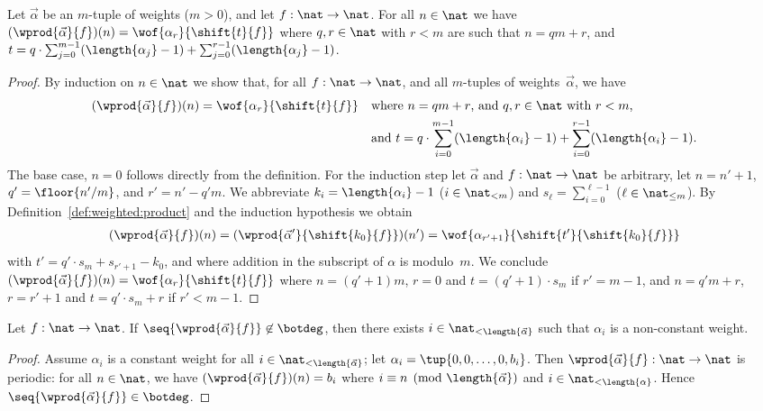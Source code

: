 \begin{lemma}\label{lem:wprod:nth}
  Let $\vec{\alpha}$ be an $m$-tuple of weights ($m > 0$), and let $f : \nat \to \nat$.
  For all $n \in \nat$ we have 
  $(\wprod{\vec{\alpha}}{f})(n) = \wof{\alpha_r}{\shift{t}{f} }$
  where $q,r \in \nat$ with $r < m$ are such that $n = qm + r$,
  and $t = q \cdot \sum_{j = 0}^{m-1}(\length{\alpha_j} - 1) + \sum_{j = 0}^{r-1}(\length{\alpha_j} - 1)$.
\end{lemma}
\begin{proof}
  By induction on $n \in \nat$ we show that, 
  for all $f : \nat \to \nat$, and all $m$-tuples of weights~$\vec{\alpha}$, 
  we have
  \begin{align*}
    (\wprod{\vec{\alpha}}{f})(n) = \wof{\alpha_r}{\shift{t}{f}}
    &&&\text{where $n = qm + r$, and $q,r \in \nat$ with $r < m$,}\\
    &&&\text{and $t = q \cdot \sum_{i = 0}^{m-1}(\length{\alpha_i} - 1) + \sum_{i = 0}^{r-1}(\length{\alpha_i} - 1)$.}
  \end{align*}
  The base case, $n = 0$ follows directly from the definition.
  For the induction step let $\vec{\alpha}$ and $f : \nat \to \nat$ be arbitrary,
  let $n = n' + 1$, $q' = \floor{n'/m}$, and $r' = n' - q'm$.
  We abbreviate $k_i = \length{\alpha_i} - 1$ ($i \in \nat_{<m}$) 
  and $s_\ell = \sum_{i=0}^{\ell-1}$ ($\ell \in \nat_{\le m}$).
  By Definition~\ref{def:weighted:product} and the induction hypothesis we obtain
  \begin{align*}
    (\wprod{\vec{\alpha}}{f})(n) 
    = (\wprod{\vec{\alpha}'}{\shift{k_0}{f}})(n') 
    = \wof{\alpha_{r'+1}}{\shift{t'}{\shift{k_0}{f}}}
  \end{align*}
  with $t' = q' \cdot s_m + s_{r'+1} - k_0$, 
  and where addition in the subscript of $\alpha$ is modulo~$m$.
  We conclude $(\wprod{\vec{\alpha}}{f})(n) = \wof{\alpha_{r}}{\shift{t}{f}}$
  where $n = (q'+1)m$, $r = 0$ and $t = (q'+1) \cdot s_m$ if $r' = m - 1$,
  and $n = q'm + r$, $r = r' + 1$ and $t = q' \cdot s_m + r$ if $r' < m - 1$.
\end{proof}

\begin{lemma}\label{lem:wprod:not:botdeg}
  Let $f : \nat \to \nat$.
  If $\seq{\wprod{\vec{\alpha}}{f}} \not\in \botdeg$, 
  then there exists $i \in \nat_{<\length{\vec{\alpha}}}$ such that $\alpha_i$ is a non-constant weight.
\end{lemma}
\begin{proof}Assume $\alpha_i$ is a constant weight for all $i \in \nat_{<\length{\vec{\alpha}}}$; 
  let $\alpha_i = \tup{0,0,\ldots,0,b_i}$. Then $\wprod{\vec{\alpha}}{f} : \nat \to \nat$ is periodic: for all $n\in\nat$, 
  we have $(\wprod{\vec{\alpha}}{f})(n) = b_i$ where $i \equiv n \pmod{\length{\vec{\alpha}}}$
  and $i \in \nat_{<\length{\alpha}}$. Hence $\seq{\wprod{\vec{\alpha}}{f}} \in \botdeg$.
\end{proof}


